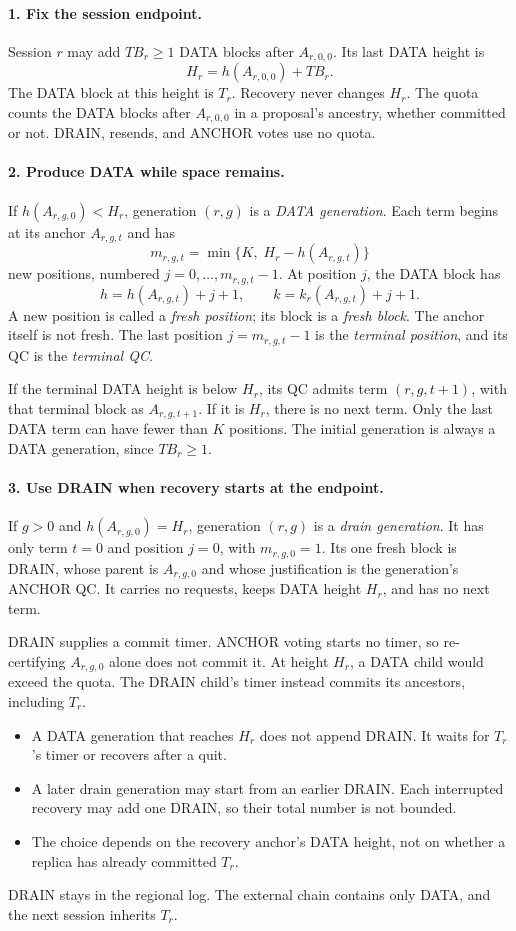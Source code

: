 \documentclass[11pt,a4paper]{article}
\newcommand{\TB}{\mathit{TB}}
\begin{document}
\paragraph{1. Fix the session endpoint.}
Session $r$ may add $\TB_r\ge1$ DATA blocks after $A_{r,0,0}$. Its last
DATA height is
\[
 H_r=h(A_{r,0,0})+\TB_r.
\]
The DATA block at this height is $T_r$. Recovery never changes $H_r$.
The quota counts the DATA blocks after $A_{r,0,0}$ in a proposal's
ancestry, whether committed or not. DRAIN, resends, and ANCHOR votes
use no quota.

\paragraph{2. Produce DATA while space remains.}
If $h(A_{r,g,0})<H_r$, generation $(r,g)$ is a \emph{DATA generation}.
Each term begins at its anchor $A_{r,g,t}$ and has
\[
 m_{r,g,t}=\min\{K,\;H_r-h(A_{r,g,t})\}
\]
new positions, numbered $j=0,\ldots,m_{r,g,t}-1$. At position $j$, the
DATA block has
\[
 h=h(A_{r,g,t})+j+1,\qquad
 k=k_r(A_{r,g,t})+j+1.
\]
A new position is called a \emph{fresh position}; its block is a
\emph{fresh block}. The anchor itself is not fresh. The last position
$j=m_{r,g,t}-1$ is the \emph{terminal position}, and its QC is the
\emph{terminal QC}.

If the terminal DATA height is below $H_r$, its QC admits term
$(r,g,t+1)$, with that terminal block as $A_{r,g,t+1}$. If it is $H_r$,
there is no next term. Only the last DATA term can have fewer than $K$
positions. The initial generation is always a DATA generation, since
$\TB_r\ge1$.

\paragraph{3. Use DRAIN when recovery starts at the endpoint.}
If $g>0$ and $h(A_{r,g,0})=H_r$, generation $(r,g)$ is a
\emph{drain generation}. It has only term $t=0$ and position $j=0$,
with $m_{r,g,0}=1$. Its one fresh block is DRAIN, whose parent is
$A_{r,g,0}$ and whose justification is the generation's ANCHOR QC.
It carries no requests, keeps DATA height $H_r$, and has no next term.

DRAIN supplies a commit timer. ANCHOR voting starts no timer, so
re-certifying $A_{r,g,0}$ alone does not commit it. At height $H_r$, a
DATA child would exceed the quota. The DRAIN child's timer instead
commits its ancestors, including $T_r$.
\begin{itemize}
\item A DATA generation that reaches $H_r$ does not append DRAIN.
It waits for $T_r$'s timer or recovers after a quit.
\item A later drain generation may start from an earlier DRAIN.
Each interrupted recovery may add one DRAIN, so their total number
is not bounded.
\item The choice depends on the recovery anchor's DATA height, not on
whether a replica has already committed $T_r$.
\end{itemize}
DRAIN stays in the regional log. The external chain contains only DATA,
and the next session inherits $T_r$.
\end{document}

